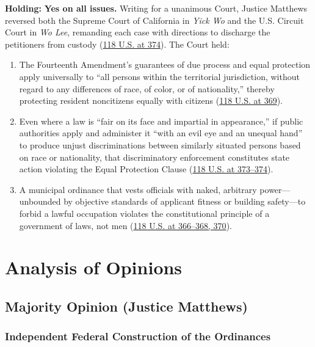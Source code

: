 \documentclass[12pt]{article}
\begin{document}
\textbf{Holding:} \textbf{Yes on all issues.} Writing for a unanimous Court, Justice Matthews reversed both the Supreme Court of California in \emph{Yick Wo} and the U.S. Circuit Court in \emph{Wo Lee}, remanding each case with directions to discharge the petitioners from custody (\href{https://supreme.justia.com/cases/federal/us/118/356/}{118 U.S. at 374}). The Court held:
\begin{enumerate}
    \item The Fourteenth Amendment's guarantees of due process and equal protection apply universally to ``all persons within the territorial jurisdiction, without regard to any differences of race, of color, or of nationality,'' thereby protecting resident noncitizens equally with citizens (\href{https://supreme.justia.com/cases/federal/us/118/356/}{118 U.S. at 369}).
    \item Even where a law is ``fair on its face and impartial in appearance,'' if public authorities apply and administer it ``with an evil eye and an unequal hand'' to produce unjust discriminations between similarly situated persons based on race or nationality, that discriminatory enforcement constitutes state action violating the Equal Protection Clause (\href{https://supreme.justia.com/cases/federal/us/118/356/}{118 U.S. at 373--374}).
    \item A municipal ordinance that vests officials with naked, arbitrary power---unbounded by objective standards of applicant fitness or building safety---to forbid a lawful occupation violates the constitutional principle of a government of laws, not men (\href{https://supreme.justia.com/cases/federal/us/118/356/}{118 U.S. at 366--368, 370}).
\end{enumerate}

\section{Analysis of Opinions}
\subsection{Majority Opinion (Justice Matthews)}

\subsubsection{Independent Federal Construction of the Ordinances}
\end{document}
